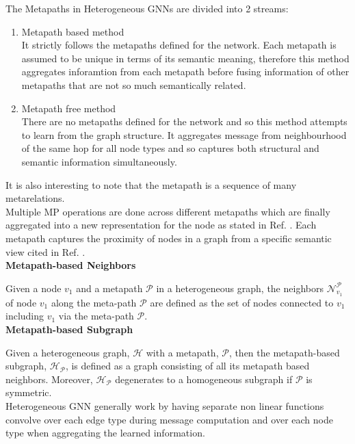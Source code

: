 \documentclass{report} %
\begin{document}
The Metapaths in Heterogeneous \ac{GNN}s are divided into 2 streams:
\begin{enumerate}[nosep]
    \item Metapath based method\\
    It strictly follows the metapaths defined for the network.
    Each metapath is assumed to be unique in terms of its semantic meaning, therefore this method aggregates inforamtion from each metapath before fusing 
    information of other metapaths that are not so much semantically related.
    \item Metapath free method\\
    There are no metapaths defined for the network and so this method attempts to learn from the graph structure.
    It aggregates message from neighbourhood of the same hop for all node types and so captures both structural and semantic information simultaneously.\\
\end{enumerate}

It is also interesting to note that the metapath is a sequence of many metarelations.\\
Multiple \ac{MP} operations are done across different metapaths which are finally aggregated into a new representation for the node as stated in Ref. \cite{ML HGNN-2023}.
Each metapath captures the proximity of nodes in a graph from a specific semantic view cited in Ref. \cite{HGNN-2020}. \\

\textbf{Metapath-based Neighbors}

Given a node $v_1$ and a metapath $\mathcal{P}$ in a heterogeneous graph, the neighbors \( \mathcal{N}_{v_1}^{\mathcal{P}} \) of 
node $v_1$ along the meta-path $\mathcal{P}$ are defined as the set of nodes connected to $ v_1$ including $v_1$ via the meta-path $\mathcal{P}$. \\

\textbf{Metapath-based Subgraph}

Given a heterogeneous graph, $\mathcal{H}$ with a metapath, $\mathcal{P}$, then the metapath-based subgraph, $\mathcal{H_P}$, is defined as a graph consisting of all 
its metapath based neighbors. Moreover, $\mathcal{H_P}$ degenerates to a homogeneous subgraph if $\mathcal{P}$ is symmetric.\\

Heterogeneous \ac{GNN} generally work by having separate non linear functions convolve over each edge type during message computation and over each node type when 
aggregating the learned information. 
\end{document}
